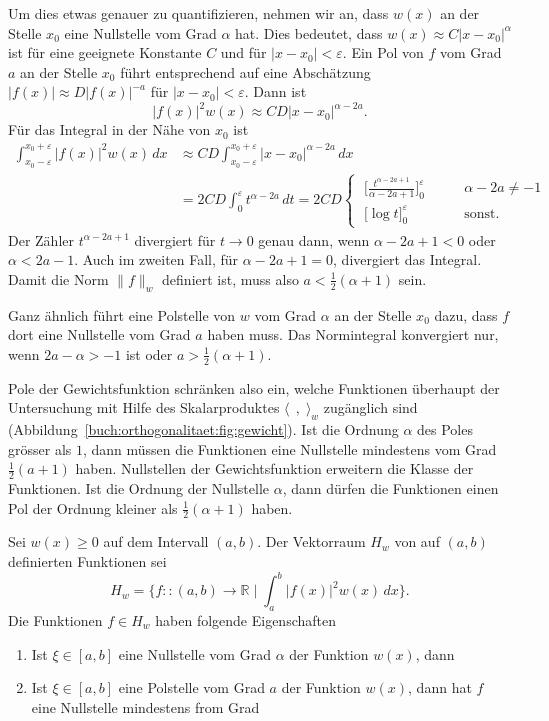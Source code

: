 Um dies etwas genauer zu quantifizieren, nehmen wir an, dass
$w(x)$ an der Stelle $x_0$ eine Nullstelle vom Grad $\alpha$ hat.
Dies bedeutet, dass $w(x) \approx C|x-x_0|^\alpha$ ist für eine geeignete
Konstante $C$ und für $|x-x_0|<\varepsilon$.
Ein Pol von $f$ vom Grad $a$ an der Stelle $x_0$ führt entsprechend auf
eine Abschätzung $|f(x)| \approx D|f(x)|^{-a}$ für $|x-x_0|<\varepsilon$.
Dann ist
\[
|f(x)|^2 w(x) \approx CD |x-x_0|^{\alpha-2a}.
\]
Für das Integral in der Nähe von $x_0$ ist
\begin{align*}
\int_{x_0-\varepsilon}^{x_0+\varepsilon}
|f(x)|^2 w(x)\,dx
&\approx 
CD
\int_{x_0-\varepsilon}^{x_0+\varepsilon}
|x-x_0|^{\alpha-2a}\,dx
\\
&=
2CD
\int_0^\varepsilon
t^{\alpha-2a}
\,dt
=
2CD
\begin{cases}
\displaystyle
\;
\biggl[\frac{t^{\alpha-2a+1}}{\alpha-2a+1}\biggr]_0^\varepsilon
&\qquad
\alpha-2a\ne-1
\\[7pt]
\displaystyle
\;
\biggl[ \log t \biggr]_0^\varepsilon
&\qquad
\text{sonst.}
\end{cases}
\end{align*}
Der Zähler $t^{\alpha-2a+1}$ divergiert für $t\to 0$ genau dann,
wenn $\alpha-2a+1<0$ oder $\alpha<2a-1$.
Auch im zweiten Fall, für $\alpha-2a+1=0$, divergiert das Integral.
Damit die Norm $\|f\|_w$ definiert ist, muss also $a<\frac12(\alpha+1)$
sein.

Ganz ähnlich führt eine Polstelle von $w$ vom Grad $\alpha$
an der Stelle $x_0$ dazu, dass $f$ dort eine Nullstelle vom Grad
$a$ haben muss.
Das Normintegral konvergiert nur, wenn $2a-\alpha > -1$ ist
oder $a > \frac12(\alpha+1)$.
 
Pole der Gewichtsfunktion schränken also ein, welche Funktionen
überhaupt der Untersuchung mit Hilfe des Skalarproduktes
$\langle\,\;,\;\rangle_w$ zugänglich sind
(Abbildung~\ref{buch:orthogonalitaet:fig:gewicht}).
Ist die Ordnung $\alpha$ des Poles grösser als $1$, dann müssen die Funktionen
eine Nullstelle mindestens vom Grad $\frac12(a+1)$ haben.
Nullstellen der Gewichtsfunktion erweitern die Klasse der Funktionen.
Ist die Ordnung der Nullstelle $\alpha$, dann dürfen die Funktionen einen
Pol der Ordnung kleiner als $\frac12(\alpha+1)$ haben.

\begin{lemma}
\label{buch:orthogonal:lemma:gewichtsfunktion}
Sei $w(x)\ge 0$ auf dem Intervall $(a,b)$.
Der Vektorraum $H_w$ von auf $(a,b)$ definierten Funktionen sei
\[
H_w
=
\biggl\{
f:\colon(a,b) \to \mathbb{R}
\;\bigg|\;
\int_a^b |f(x)|^2 w(x)\,dx
\biggr\}.
\]
Die Funktionen $f\in H_w$ haben folgende Eigenschaften
\begin{enumerate}
\item
Ist $\xi\in[a,b]$ eine Nullstelle vom Grad $\alpha$ der Funktion $w(x)$,
dann 
\item
Ist $\xi\in[a,b]$ eine Polstelle vom Grad $a$ der Funktion $w(x)$,
dann hat $f$ eine Nullstelle mindestens from Grad 
\end{enumerate}
\end{lemma}


